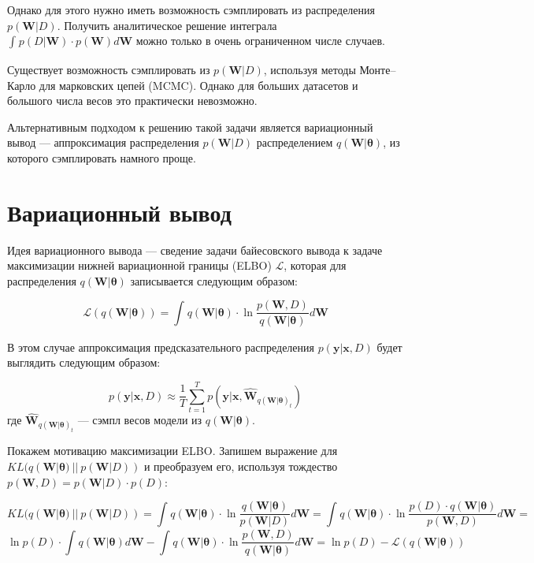 \documentclass{article}
\begin{document}
Однако для этого нужно иметь возможность сэмплировать из распределения $p(\pmb{W}| D)$. Получить аналитическое решение интеграла $\int_{}{} p(D | \pmb{W}) \cdot p(\pmb{W}) d \pmb{W}$ можно только в очень ограниченном числе случаев.

Существует возможность сэмплировать из $p(\pmb{W}| D)$, используя методы Монте--Карло для марковских цепей (MCMC). Однако для больших датасетов и большого числа весов это практически невозможно.

Альтернативным подходом к решению такой задачи является вариационный вывод --- аппроксимация распределения $p(\pmb{W}| D)$ распределением $q(\pmb{W} | \pmb{\theta})$, из которого сэмплировать намного проще.

\section{Вариационный вывод}

Идея вариационного вывода --- сведение задачи байесовского вывода к задаче максимизации нижней вариационной границы (ELBO) $\mathcal{L}$, которая для распределения $q(\pmb{W} | \pmb{\theta})$ записывается следующим образом:

\[
\mathcal{L}(q(\pmb{W} | \pmb{\theta})) =
\int_{}{} q(\pmb{W} | \pmb{\theta}) \cdot \ln{\dfrac{p(\pmb{W}, D)}{q(\pmb{W} | \pmb{\theta})}} d \pmb{W}
\]

В этом случае аппроксимация предсказательного распределения $p(\pmb{y} | \pmb{x}, D)$ будет выглядить следующим образом:

\[
p(\pmb{y} | \pmb{x}, D)
\approx \dfrac{1}{T} \sum_{t=1}^{T}{p(\pmb{y} | \pmb{x}, \hat{\pmb{W}}_{q(\pmb{W} | \pmb{\theta})_{t}})}
\]
где $\hat{\pmb{W}}_{q(\pmb{W} | \pmb{\theta})_{t}}$ --- сэмпл весов модели из $q(\pmb{W} | \pmb{\theta})$.

Покажем мотивацию максимизации ELBO. Запишем выражение для $KL(q(\pmb{W} | \pmb{\theta})~||~p(\pmb{W}| D))$ и преобразуем его, используя тождество $p(\pmb{W}, D) = p(\pmb{W}| D)\cdot p(D)$:

\[
KL(q(\pmb{W} | \pmb{\theta})~||~p(\pmb{W}| D)) =
\int_{}{} q(\pmb{W} | \pmb{\theta}) \cdot \ln{\dfrac{q(\pmb{W} | \pmb{\theta})}{p(\pmb{W}| D)}} d \pmb{W} =
\int_{}{} q(\pmb{W} | \pmb{\theta}) \cdot \ln{\dfrac{p(D) \cdot q(\pmb{W} | \pmb{\theta})}{p(\pmb{W}, D)}} d \pmb{W} =
\]\[
\ln{p(D)} \cdot \int_{}{} q(\pmb{W} | \pmb{\theta}) d \pmb{W} - \int_{}{} q(\pmb{W} | \pmb{\theta}) \cdot \ln{\dfrac{p(\pmb{W}, D)}{q(\pmb{W} | \pmb{\theta})}} d \pmb{W} =
\ln{p(D)} - \mathcal{L}(q(\pmb{W} | \pmb{\theta}))
\]
\end{document}
